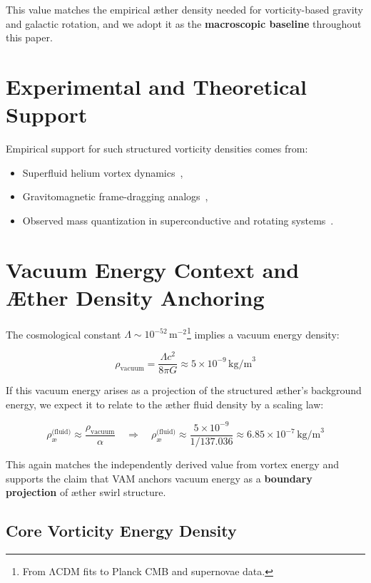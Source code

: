 \documentclass[12pt]{article}
\begin{document}
    This value matches the empirical æther density needed for vorticity-based gravity and galactic rotation, and we adopt it as the \textbf{macroscopic baseline} throughout this paper.

    \section{Experimental and Theoretical Support}

    Empirical support for such structured vorticity densities comes from:

    \begin{itemize}
        \item Superfluid helium vortex dynamics~\cite{jackson2021},
        \item Gravitomagnetic frame-dragging analogs~\cite{paris2015},
        \item Observed mass quantization in superconductive and rotating systems~\cite{santiago2011}.
    \end{itemize}

    \section{Vacuum Energy Context and Æther Density Anchoring}

    The cosmological constant \( \Lambda \sim 10^{-52} \, \text{m}^{-2} \)\footnote{From ΛCDM fits to Planck CMB and supernovae data.} implies a vacuum energy density:

    \[
        \rho_{\text{vacuum}} = \frac{\Lambda c^2}{8\pi G} \approx 5 \times 10^{-9} \, \text{kg/m}^3
    \]

    If this vacuum energy arises as a projection of the structured æther's background energy, we expect it to relate to the æther fluid density by a scaling law:

    \[
        \rho_{\text{\ae}}^{\text{(fluid)}} \approx \frac{\rho_{\text{vacuum}}}{\alpha}
        \quad \Rightarrow \quad
        \rho_{\text{\ae}}^{\text{(fluid)}} \approx \frac{5 \times 10^{-9}}{1/137.036} \approx 6.85 \times 10^{-7} \, \text{kg/m}^3
    \]

    This again matches the independently derived value from vortex energy and supports the claim that VAM anchors vacuum energy as a \textbf{boundary projection} of æther swirl structure.

    \subsection{Core Vorticity Energy Density}
\end{document}
